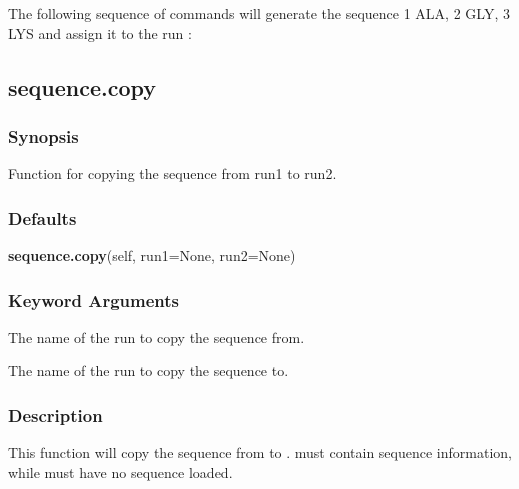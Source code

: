The following sequence of commands will generate the sequence 1 ALA, 2 GLY, 3 LYS and assign it to the run :








\newpage

\subsection{sequence.copy}


\subsubsection{Synopsis}

Function for copying the sequence from run1 to run2.



\subsubsection{Defaults}

\textsf{\textbf{sequence.copy}(self, run1=None, run2=None)}


\subsubsection{Keyword Arguments}

  The name of the run to copy the sequence from. 

  The name of the run to copy the sequence to. 




\subsubsection{Description}

This function will copy the sequence from  to .   must contain sequence information, while  must have no sequence loaded.



